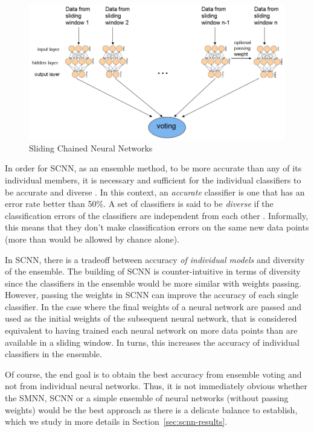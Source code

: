 \documentclass[conference]{IEEEtran}
\begin{document}
		\begin{figure}[H]
			\centering
			\includegraphics[width=1\linewidth]{figures/SNN}
			\caption{Sliding Chained Neural Networks}
			\label{fig:SNN}
		\end{figure}

                In order for SCNN, as an ensemble method, to be more accurate than any of its individual members, it is necessary and sufficient for the individual classifiers to be accurate and diverse \cite{Hansen}. In this context, an \emph{accurate} classifier is one that has an error rate better than 50\%. A set of classifiers is said to be \emph{diverse} if the classification errors of the classifiers are independent from each other \cite{Dietterich}. Informally, this means that they don't make classification errors on the same new data points (more than would be allowed by chance alone). 
		
                In SCNN, there is a tradeoff between accuracy \emph{of individual models} and diversity of the ensemble. The building of SCNN is counter-intuitive in terms of diversity since the classifiers in the ensemble would be more similar with weights passing. However, passing the weights in SCNN can improve the accuracy of each single classifier. In the case where the final weights of a neural network are passed and used as the initial weights of the subsequent neural network, that is considered equivalent to having trained each neural network on more data points than are available in a sliding window. In turns, this increases the accuracy of individual classifiers in the ensemble.
		
		Of course, the end goal is to obtain the best accuracy from ensemble voting and not from individual neural networks. Thus, it is not immediately obvious whether the SMNN, SCNN or a simple ensemble of neural networks (without passing weights) would be the best approach as there is a delicate balance to establish, which we study in more details in Section~\ref{sec:scnn-results}.
		
\end{document}

